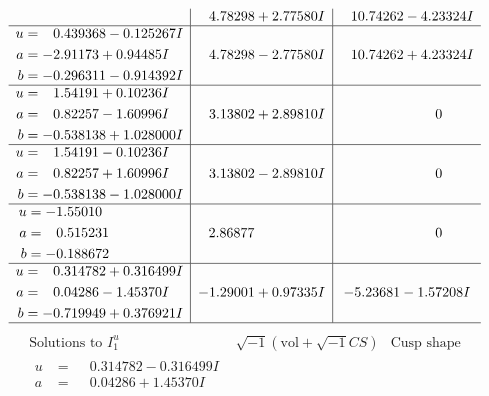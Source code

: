\documentclass[1p]{elsarticle_modified}
\theoremstyle{definition}
\newcommand{\I}{\sqrt{-1}}
\begin{document}
$$\begin{array}{c|c|c}
 & \phantom{-}4.78298 + 2.77580 I & \phantom{-}10.74262 - 4.23324 I \\ \hline\begin{aligned}
u &= \phantom{-}0.439368 - 0.125267 I \\
a &= -2.91173 + 0.94485 I \\
b &= -0.296311 - 0.914392 I\end{aligned}
 & \phantom{-}4.78298 - 2.77580 I & \phantom{-}10.74262 + 4.23324 I \\ \hline\begin{aligned}
u &= \phantom{-}1.54191 + 0.10236 I \\
a &= \phantom{-}0.82257 - 1.60996 I \\
b &= -0.538138 + 1.028000 I\end{aligned}
 & \phantom{-}3.13802 + 2.89810 I & \phantom{-0.000000 } 0 \\ \hline\begin{aligned}
u &= \phantom{-}1.54191 - 0.10236 I \\
a &= \phantom{-}0.82257 + 1.60996 I \\
b &= -0.538138 - 1.028000 I\end{aligned}
 & \phantom{-}3.13802 - 2.89810 I & \phantom{-0.000000 } 0 \\ \hline\begin{aligned}
u &= -1.55010\phantom{ +0.000000I} \\
a &= \phantom{-}0.515231\phantom{ +0.000000I} \\
b &= -0.188672\phantom{ +0.000000I}\end{aligned}
 & \phantom{-}2.86877\phantom{ +0.000000I} & \phantom{-0.000000 } 0 \\ \hline\begin{aligned}
u &= \phantom{-}0.314782 + 0.316499 I \\
a &= \phantom{-}0.04286 - 1.45370 I \\
b &= -0.719949 + 0.376921 I\end{aligned}
 & -1.29001 + 0.97335 I & -5.23681 - 1.57208 I\\
 \hline 
 \end{array}$$\newpage$$\begin{array}{c|c|c}  
\text{Solutions to }I^u_{1}& \I (\text{vol} + \sqrt{-1}CS) & \text{Cusp shape}\\
 \hline 
\begin{aligned}
u &= \phantom{-}0.314782 - 0.316499 I \\
a &= \phantom{-}0.04286 + 1.45370 I \\

\end{aligned}
\end{array}$$
\end{document}
